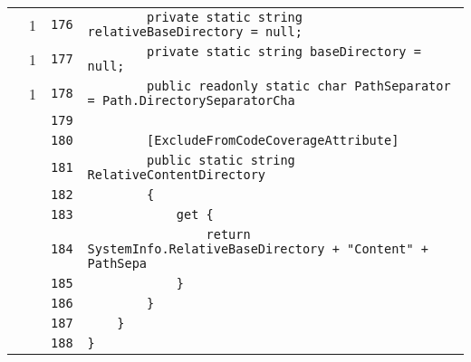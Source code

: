 \documentclass[a4paper,10pt]{article}
\begin{document}
\begin{longtable}[l]{lrrl}
\cellcolor{green} & 1 & \verb~176~ & \verb~        private static string relativeBaseDirectory = null;~\\
\cellcolor{green} & 1 & \verb~177~ & \verb~        private static string baseDirectory = null;~\\
\cellcolor{green} & 1 & \verb~178~ & \verb~        public readonly static char PathSeparator = Path.DirectorySeparatorCha~\\
\cellcolor{gray} &  & \verb~179~ & \verb~~\\
\cellcolor{gray} &  & \verb~180~ & \verb~        [ExcludeFromCodeCoverageAttribute]~\\
\cellcolor{gray} &  & \verb~181~ & \verb~        public static string RelativeContentDirectory~\\
\cellcolor{gray} &  & \verb~182~ & \verb~        {~\\
\cellcolor{gray} &  & \verb~183~ & \verb~            get {~\\
\cellcolor{gray} &  & \verb~184~ & \verb~                return SystemInfo.RelativeBaseDirectory + "Content" + PathSepa~\\
\cellcolor{gray} &  & \verb~185~ & \verb~            }~\\
\cellcolor{gray} &  & \verb~186~ & \verb~        }~\\
\cellcolor{gray} &  & \verb~187~ & \verb~    }~\\
\cellcolor{gray} &  & \verb~188~ & \verb~}~\\
\end{longtable}
\end{document}

